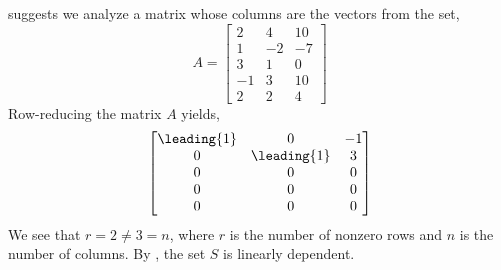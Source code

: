  suggests we analyze a matrix whose columns are the vectors from the set,
%
\begin{equation*}
A=\begin{bmatrix}
 2 & 4 & 10 \\
 1 & -2 & -7 \\
 3 & 1 & 0 \\
 -1 & 3 & 10 \\
 2 & 2 & 4
\end{bmatrix}
\end{equation*}
%
Row-reducing the matrix $A$ yields,
%
\begin{equation*}
\begin{bmatrix}
 \leading{1} & 0 & -1 \\
 0 & \leading{1} & 3 \\
 0 & 0 & 0 \\
 0 & 0 & 0 \\
 0 & 0 & 0
\end{bmatrix}
\end{equation*}
%
We see that $r=2\neq 3=n$, where $r$ is the number of nonzero rows and $n$ is the number of columns.  By , the set $S$ is  linearly dependent.
